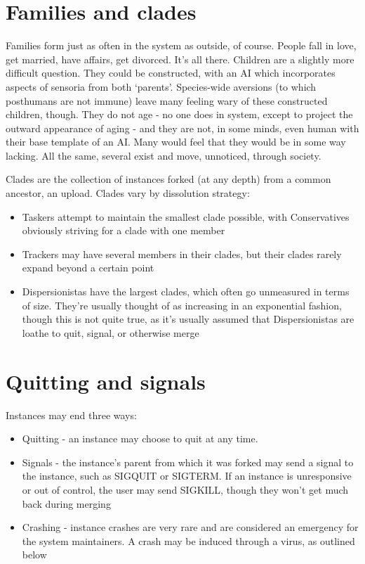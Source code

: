 \hypertarget{families-and-clades}{%
\section*{Families and clades}\label{families-and-clades}}

Families form just as often in the system as outside, of course. People fall in love, get married, have affairs, get divorced. It's all there. Children are a slightly more difficult question. They could be constructed, with an AI which incorporates aspects of sensoria from both `parents'. Species-wide aversions (to which posthumans are not immune) leave many feeling wary of these constructed children, though. They do not age - no one does in system, except to project the outward appearance of aging - and they are not, in some minds, even human with their base template of an AI. Many would feel that they would be in some way lacking. All the same, several exist and move, unnoticed, through society.

Clades are the collection of instances forked (at any depth) from a common ancestor, an upload. Clades vary by dissolution strategy:

\begin{itemize}
\tightlist
\item
  Taskers attempt to maintain the smallest clade possible, with Conservatives obviously striving for a clade with one member
\item
  Trackers may have several members in their clades, but their clades rarely expand beyond a certain point
\item
  Dispersionistas have the largest clades, which often go unmeasured in terms of size. They're usually thought of as increasing in an exponential fashion, though this is not quite true, as it's usually assumed that Dispersionistas are loathe to quit, signal, or otherwise merge
\end{itemize}

\hypertarget{quitting-and-signals}{%
\section*{Quitting and signals}\label{quitting-and-signals}}

Instances may end three ways:

\begin{itemize}
\tightlist
\item
  Quitting - an instance may choose to quit at any time.
\item
  Signals - the instance's parent from which it was forked may send a signal to the instance, such as SIGQUIT or SIGTERM. If an instance is unresponsive or out of control, the user may send SIGKILL, though they won't get much back during merging
\item
  Crashing - instance crashes are very rare and are considered an emergency for the system maintainers. A crash may be induced through a virus, as outlined below
\end{itemize}


